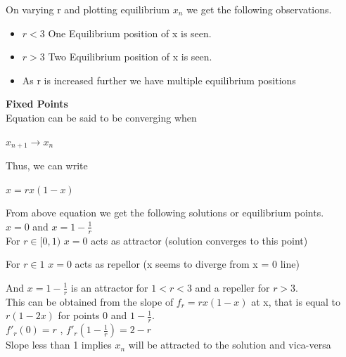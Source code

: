 \documentclass{report}
\begin{document}
On varying r and plotting equilibrium $x_{n}$ we get the following observations.

\begin{itemize}
  \item $r < 3$ One Equilibrium position of x is seen.
  \item $r > 3$ Two Equilibrium position of x is seen.
  \item As r is increased further we have multiple equilibrium positions
\end{itemize}

\textbf{Fixed Points} \\



Equation can be said to be converging when

$x_{n+1} \to x_n$

Thus, we can write

$x = rx(1-x)$

From above equation we get the following solutions or equilibrium points.\\

$x = 0$ and $x = 1 - \frac{1}{r}$\\

For $r \in [0,1)$ $x = 0$ acts as attractor (solution converges to this point)

For $r \in 1$ $x = 0$ acts as repellor (x seems to diverge from x = 0 line)

And $x = 1 - \frac{1}{r}$ is an attractor for $1 < r < 3$ and a repeller for $r > 3$.\\

This can be obtained from the slope of $f_r = rx(1-x)$ at x, that is equal to $r(1-2x)$ for points 0 and $1-\frac{1}{r}$.\\

$f'_r(0) = r$ , $f'_r(1-\frac{1}{r}) = 2-r$\\



Slope less than 1 implies $x_n$ will be attracted to the solution and vica-versa
\end{document}
